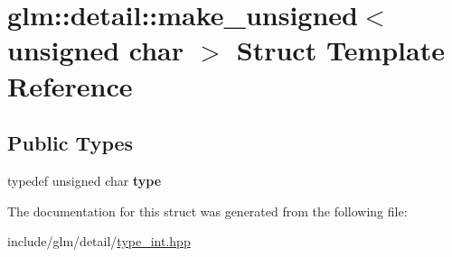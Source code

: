 \hypertarget{structglm_1_1detail_1_1make__unsigned_3_01unsigned_01char_01_4}{}\section{glm\+:\+:detail\+:\+:make\+\_\+unsigned$<$ unsigned char $>$ Struct Template Reference}
\label{structglm_1_1detail_1_1make__unsigned_3_01unsigned_01char_01_4}
\subsection*{Public Types}
\begin{DoxyCompactItemize}
\item 
\mbox{\label{structglm_1_1detail_1_1make__unsigned_3_01unsigned_01char_01_4_a783a55dc0559d4b972a0d85cf08256f2}} 
typedef unsigned char {\bfseries type}
\end{DoxyCompactItemize}


The documentation for this struct was generated from the following file\+:\begin{DoxyCompactItemize}
\item 
include/glm/detail/\hyperlink{type__int_8hpp}{type\+\_\+int.\+hpp}\end{DoxyCompactItemize}

